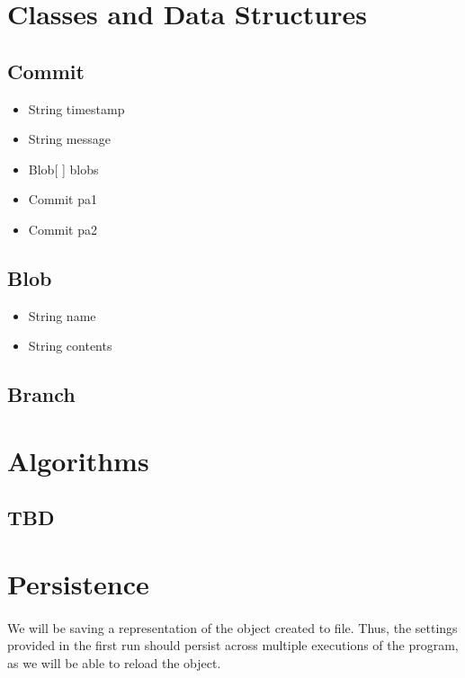 \documentclass[10pt]{article}
\begin{document}
\newpage

\section{Classes and Data Structures} %
\subsection{Commit} %
  \begin{adjustwidth}{2em}{0pt}
  \begin{itemize}
  \item String timestamp
  \item String message
  \item Blob[ ] blobs
  \item Commit pa1
  \item Commit pa2
  \end{itemize}
  \end{adjustwidth}
 
\subsection{Blob} %
\begin{adjustwidth}{2em}{0pt}
  \begin{itemize}
  \item String name
  \item String contents
  \end{itemize}
  \end{adjustwidth}
  
\subsection{Branch} %

\section{Algorithms} %
\subsection{TBD} %


\section{Persistence} %

\paragraph{} We will be saving a representation of the object created to file. Thus, the settings provided in the first run should persist across multiple executions of the program, as we will be able to reload the object. 
\end{document}
